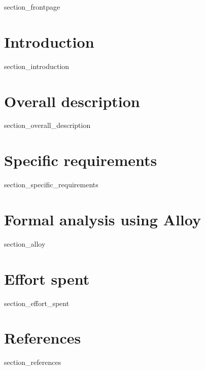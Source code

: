 \documentclass[a4paper]{article}
\begin{document}
{section_frontpage}

\newpage
{}

\tableofcontents

\newpage
{}

\section{Introduction}\label{introduction}

{section_introduction}

\newpage

\section{Overall description}\label{overall_description}

{section_overall_description}

\newpage

\section{Specific requirements}\label{specific_requirements}

{section_specific_requirements}

\newpage

\section{Formal analysis using Alloy}\label{formal_analysis_using_alloy}

{section_alloy}

\newpage

\section{Effort spent}\label{effort_spent}

{section_effort_spent}

\section{References}\label{references}

{section_references}
\end{document}
